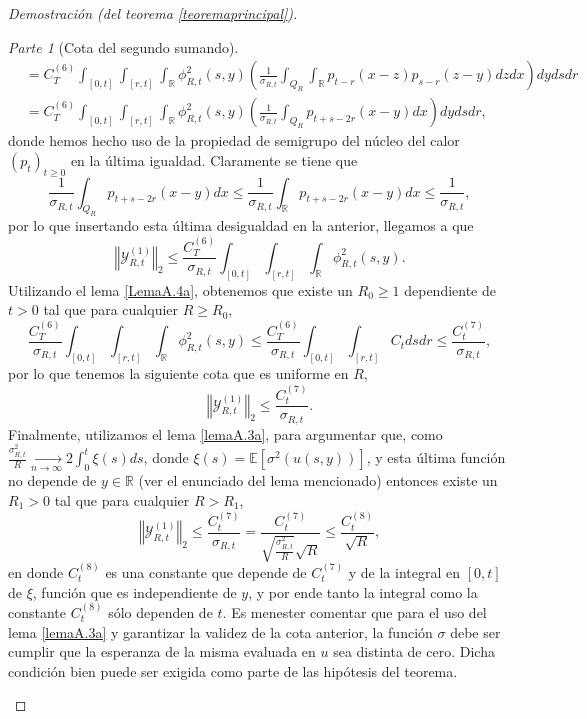 \documentclass[letterpaper,twoside,12pt]{book}
\newcommand{\R}{\mathbb{R}}
\newcommand{\E}{\mathbb{E}}
\newcommand{\1}{\mathds{1}}
\renewcommand{\to}{\rightarrow}
\newcommand{\norm}[1]{\left\Vert #1 \right\Vert}
\theoremstyle{definition}
\theoremstyle{definition}
\theoremstyle{remark}
\newtheorem{proofpart}{Parte}
\theoremstyle{definition}
\theoremstyle{definition}
\theoremstyle{definition}
\theoremstyle{definition}
\theoremstyle{definition}
\begin{document}
\begin{proof}[Demostración (del teorema \ref{teoremaprincipal})]
\begin{proofpart}[Cota del segundo sumando]
\begin{align*}
   &=C^{(6)}_T\int_{[0,t]}\int_{[r,t]}\int_{\R}\phi_{R,t}^2(s,y)\left(\frac{1}{\sigma_{R,t}}\int_{Q_R}\int_\R p_{t-r}(x-z)p_{s-r}(z-y)dz dx\right)dy ds dr\\
   &=C^{(6)}_T\int_{[0,t]}\int_{[r,t]}\int_{\R}\phi_{R,t}^2(s,y)\left(\frac{1}{\sigma_{R,t}}\int_{Q_R}p_{t+s-2r}(x-y)dx\right)dy ds dr,
\end{align*}
donde hemos hecho uso de la propiedad de semigrupo del núcleo del calor $(p_t)_{t\geq0}$ en la última igualdad. Claramente se tiene que 
\[
   \frac{1}{\sigma_{R,t}}\int_{Q_R}p_{t+s-2r}(x-y)dx\leq \frac{1}{\sigma_{R,t}}\int_{\R}p_{t+s-2r}(x-y)dx\leq \frac{1}{\sigma_{R,t}},
\]
por lo que insertando esta última desigualdad en la anterior, llegamos a que 
\[
\norm{\mathcal{Y}_{R,t}^{(1)}}_2\leq \frac{C_T^{(6)}}{\sigma_{R,t}}\int_{[0,t]}\int_{[r,t]}\int_{\R}\phi_{R,t}^2(s,y).
\]
Utilizando el lema \ref{LemaA.4a}, obtenemos que existe un $R_0\geq1$ dependiente de $t>0$ tal que para cualquier $R\geq R_0$,
\[
   \frac{C_T^{(6)}}{\sigma_{R,t}}\int_{[0,t]}\int_{[r,t]}\int_{\R}\phi_{R,t}^2(s,y)\leq \frac{C_T^{(6)}}{\sigma_{R,t}}\int_{[0,t]}\int_{[r,t]}C_t ds dr\leq \frac{C_t^{(7)}}{\sigma_{R,t}},
\]
por lo que tenemos la siguiente cota que es uniforme en $R$,
\[
\norm{\mathcal{Y}_{R,t}^{(1)}}_2\leq \frac{C_t^{(7)}}{\sigma_{R,t}}.
\]
Finalmente, utilizamos el lema \ref{lemaA.3a}, para argumentar que, como $\tfrac{\sigma^2_{R,t}}{R} \xrightarrow[n\to\infty]{}2\int_{0}^{t}\xi(s)ds$, donde $\xi(s)=\E\left[\sigma^2(u(s,y))\right]$, y esta última función no depende de $y\in \R$ (ver el enunciado del lema mencionado) entonces existe un $R_1>0$ tal que para cualquier $R>R_1$,
\begin{equation}\label{cotafinal1}
      \norm{\mathcal{Y}_{R,t}^{(1)}}_2\leq \frac{C_t^{(7)}}{\sigma_{R,t}}=\frac{C_t^{(7)}}{\sqrt{\frac{\sigma_{R,t}^2}{R}}\sqrt{R}}\leq \frac{C_t^{(8)}}{\sqrt{R}},  
\end{equation}
en donde $C_t^{(8)}$ es una constante que depende de $C_t^{(7)}$ y de la integral en $[0,t]$ de $\xi$, función que es independiente de $y$, y por ende tanto la integral como la constante $C_t^{(8)}$ sólo dependen de $t$. Es menester comentar que para el uso del lema \ref{lemaA.3a} y garantizar la validez de la cota anterior, la función $\sigma$ debe ser cumplir que la esperanza de la misma evaluada en $u$ sea distinta de cero. Dicha condición bien puede ser exigida como parte de las hipótesis del teorema.  


\end{proofpart}
\end{proof}
\end{document}
